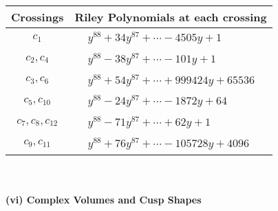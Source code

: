 \documentclass[1p]{elsarticle_modified}
\theoremstyle{definition}
\begin{document}
\begin{tabular}{m{50pt}|m{274pt}}
Crossings & \hspace{64pt}Riley Polynomials at each crossing \\
\hline $$\begin{aligned}c_{1}\end{aligned}$$&$\begin{aligned}
&y^{88}+34 y^{87}+\cdots-4505 y+1
\end{aligned}$\\
\hline $$\begin{aligned}c_{2},c_{4}\end{aligned}$$&$\begin{aligned}
&y^{88}-38 y^{87}+\cdots-101 y+1
\end{aligned}$\\
\hline $$\begin{aligned}c_{3},c_{6}\end{aligned}$$&$\begin{aligned}
&y^{88}+54 y^{87}+\cdots+999424 y+65536
\end{aligned}$\\
\hline $$\begin{aligned}c_{5},c_{10}\end{aligned}$$&$\begin{aligned}
&y^{88}-24 y^{87}+\cdots-1872 y+64
\end{aligned}$\\
\hline $$\begin{aligned}c_{7},c_{8},c_{12}\end{aligned}$$&$\begin{aligned}
&y^{88}-71 y^{87}+\cdots+62 y+1
\end{aligned}$\\
\hline $$\begin{aligned}c_{9},c_{11}\end{aligned}$$&$\begin{aligned}
&y^{88}+76 y^{87}+\cdots-105728 y+4096
\end{aligned}$\\
\hline
\end{tabular}\\~\\
\newpage\flushleft \textbf{(vi) Complex Volumes and Cusp Shapes}
\end{document}

